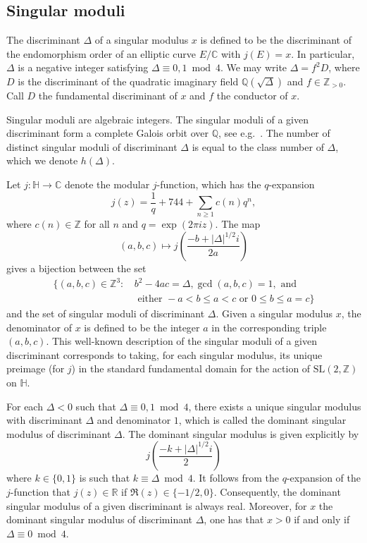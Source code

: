 \documentclass[12pt,a4paper,oneside]{amsart}
\begin{document}
	\subsection{Singular moduli}\label{subsec:singmod}
	
The discriminant $\Delta$ of a singular modulus $x$ is defined to be the discriminant of the endomorphism order of an elliptic curve $E / \mathbb{C}$ with $j(E) = x$. In particular, $\Delta$ is a negative integer satisfying $\Delta \equiv 0, 1 \bmod 4$. We may write $\Delta = f^2 D$, where $D$ is the discriminant of the quadratic imaginary field $\mathbb{Q}(\sqrt{\Delta})$ and $f \in \mathbb{Z}_{>0}$. Call $D$ the fundamental discriminant of $x$ and $f$ the conductor of $x$. 
	
	Singular moduli are algebraic integers. The singular moduli of a given discriminant form a complete Galois orbit over $\mathbb{Q}$, see e.g.~\cite[Prop.~13.2]{Cox89}. The number of distinct singular moduli of discriminant $\Delta$ is equal to the class number of $\Delta$, which we denote $h(\Delta)$. 
	
	Let $j \colon \mathbb{H} \to \mathbb{C}$ denote the modular $j$-function, which has the $q$-expansion
	\[ j(z) = \frac{1}{q} + 744 + \sum_{n \geq 1} c(n) q^n,\]
	where $c(n) \in \mathbb{Z}$ for all $n$ and $q = \exp(2 \pi i z)$. The map
	\[ (a, b, c) \mapsto j\left(\frac{-b + \lvert \Delta \rvert^{1/2} i}{2a}\right)\]
	gives a bijection between the set
	\begin{align*} 
	\{\left(a, b, c\right) \in \mathbb{Z}^3 : \, & b^2 - 4ac = \Delta, \gcd\left(a, b, c\right) = 1, \mbox{ and} \\
	& \mbox{ either } -a < b \leq a < c \mbox{ or } 0 \leq b \leq a = c \}
	\end{align*}
	and the set of singular moduli of discriminant $\Delta$. Given a singular modulus $x$, the denominator of $x$ is defined to be the integer $a$ in the corresponding triple $(a, b, c)$. This well-known description of the singular moduli of a given discriminant corresponds to taking, for each singular modulus, its unique preimage (for $j$) in the standard fundamental domain for the action of $\mathrm{SL}(2, \mathbb{Z})$ on $\mathbb{H}$.
	
	For each $\Delta < 0$ such that $\Delta \equiv 0, 1 \bmod 4$, there exists a unique singular modulus with discriminant $\Delta$ and denominator $1$, which is called the dominant singular modulus of discriminant $\Delta$. The dominant singular modulus is given explicitly by
	\[ j\left(\frac{-k + \lvert \Delta \rvert^{1/2} i}{2}\right)\]
	where $k \in \{0, 1\}$ is such that $k \equiv \Delta \bmod 4$. It follows from the $q$-expansion of the $j$-function that $j(z) \in \mathbb{R}$ if $\Re (z) \in \{-1/2, 0\}$. Consequently, the dominant singular modulus of a given discriminant is always real. Moreover, for $x$ the dominant singular modulus of discriminant $\Delta$, one has that $x>0$ if and only if $\Delta \equiv 0 \bmod 4$.
	
\end{document}
